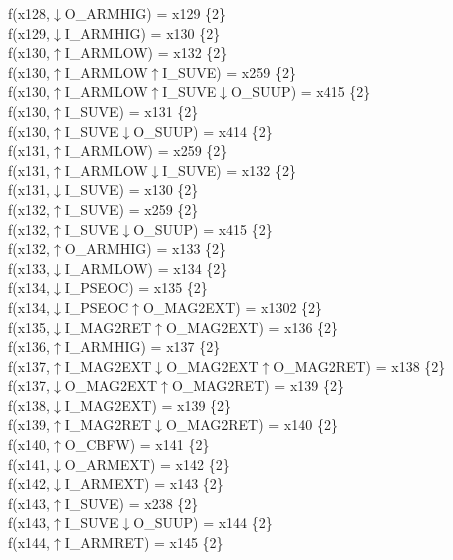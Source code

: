 f(x128,$\downarrow$O\_ARMHIG) = x129 \{2\} \\  
f(x129,$\downarrow$I\_ARMHIG) = x130 \{2\} \\  
f(x130,$\uparrow$I\_ARMLOW) = x132 \{2\} \\  
f(x130,$\uparrow$I\_ARMLOW$\uparrow$I\_SUVE) = x259 \{2\} \\  
f(x130,$\uparrow$I\_ARMLOW$\uparrow$I\_SUVE$\downarrow$O\_SUUP) = x415 \{2\} \\  
f(x130,$\uparrow$I\_SUVE) = x131 \{2\} \\  
f(x130,$\uparrow$I\_SUVE$\downarrow$O\_SUUP) = x414 \{2\} \\  
f(x131,$\uparrow$I\_ARMLOW) = x259 \{2\} \\  
f(x131,$\uparrow$I\_ARMLOW$\downarrow$I\_SUVE) = x132 \{2\} \\  
f(x131,$\downarrow$I\_SUVE) = x130 \{2\} \\  
f(x132,$\uparrow$I\_SUVE) = x259 \{2\} \\  
f(x132,$\uparrow$I\_SUVE$\downarrow$O\_SUUP) = x415 \{2\} \\  
f(x132,$\uparrow$O\_ARMHIG) = x133 \{2\} \\  
f(x133,$\downarrow$I\_ARMLOW) = x134 \{2\} \\  
f(x134,$\downarrow$I\_PSEOC) = x135 \{2\} \\  
f(x134,$\downarrow$I\_PSEOC$\uparrow$O\_MAG2EXT) = x1302 \{2\} \\  
f(x135,$\downarrow$I\_MAG2RET$\uparrow$O\_MAG2EXT) = x136 \{2\} \\  
f(x136,$\uparrow$I\_ARMHIG) = x137 \{2\} \\  
f(x137,$\uparrow$I\_MAG2EXT$\downarrow$O\_MAG2EXT$\uparrow$O\_MAG2RET) = x138 \{2\} \\  
f(x137,$\downarrow$O\_MAG2EXT$\uparrow$O\_MAG2RET) = x139 \{2\} \\  
f(x138,$\downarrow$I\_MAG2EXT) = x139 \{2\} \\  
f(x139,$\uparrow$I\_MAG2RET$\downarrow$O\_MAG2RET) = x140 \{2\} \\  
f(x140,$\uparrow$O\_CBFW) = x141 \{2\} \\  
f(x141,$\downarrow$O\_ARMEXT) = x142 \{2\} \\  
f(x142,$\downarrow$I\_ARMEXT) = x143 \{2\} \\  
f(x143,$\uparrow$I\_SUVE) = x238 \{2\} \\  
f(x143,$\uparrow$I\_SUVE$\downarrow$O\_SUUP) = x144 \{2\} \\  
f(x144,$\uparrow$I\_ARMRET) = x145 \{2\} \\  
